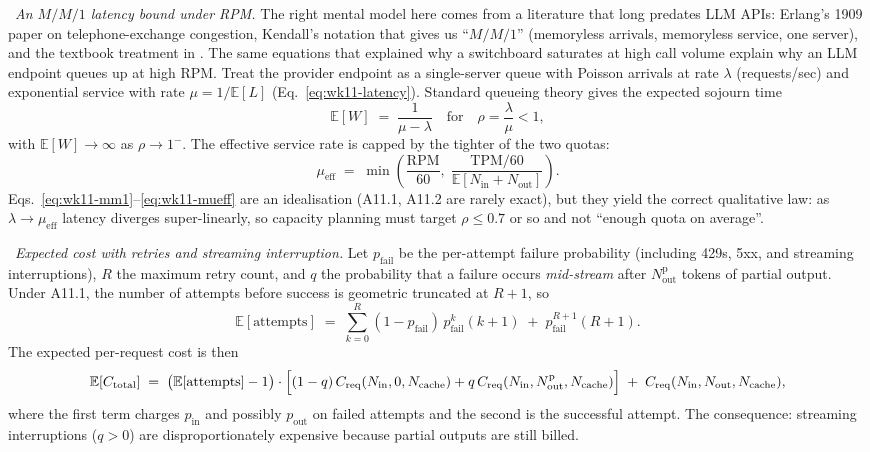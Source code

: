 \Ident\ \emph{An $M/M/1$ latency bound under RPM.} The right
mental model here comes from a literature that long predates LLM
APIs: Erlang's 1909 paper on telephone-exchange congestion,
Kendall's notation that gives us ``$M/M/1$'' (memoryless arrivals,
memoryless service, one server), and the textbook treatment in
\citet{kleinrock1975queueing}. The same equations that explained
why a switchboard saturates at high call volume explain why an
LLM endpoint queues up at high RPM. Treat the provider endpoint
as a single-server queue with Poisson arrivals at rate $\lambda$
(requests/sec) and exponential service with rate
$\mu = 1/\mathbb{E}[L]$ (Eq.~\eqref{eq:wk11-latency}). Standard
queueing theory gives the expected sojourn time
\begin{equation}
  \mathbb{E}[W]
  \;=\; \frac{1}{\mu - \lambda}
  \quad\text{for}\quad
  \rho = \frac{\lambda}{\mu} < 1,
  \label{eq:wk11-mm1}
\end{equation}
with $\mathbb{E}[W] \to \infty$ as $\rho \to 1^-$. The effective
service rate is capped by the tighter of the two quotas:
\begin{equation}
  \mu_\mathrm{eff}
  \;=\; \min\!\left(
      \frac{\mathrm{RPM}}{60},\;
      \frac{\mathrm{TPM}/60}{\mathbb{E}[N_\mathrm{in} + N_\mathrm{out}]}
  \right).
  \label{eq:wk11-mueff}
\end{equation}
Eqs.~\eqref{eq:wk11-mm1}--\eqref{eq:wk11-mueff} are an idealisation
(A11.1, A11.2 are rarely exact), but they yield the correct
qualitative law: as $\lambda \to \mu_\mathrm{eff}$ latency diverges
super-linearly, so capacity planning must target $\rho \le 0.7$ or
so and not ``enough quota on average''.

\Ident\ \emph{Expected cost with retries and streaming
interruption.} Let $p_\mathrm{fail}$ be the per-attempt failure
probability (including 429s, 5xx, and streaming interruptions),
$R$ the maximum retry count, and $q$ the probability that a
failure occurs \emph{mid-stream} after $N_\mathrm{out}^\mathrm{p}$
tokens of partial output. Under A11.1, the number of attempts
before success is geometric truncated at $R+1$, so
\begin{equation}
  \mathbb{E}[\text{attempts}]
  \;=\; \sum_{k=0}^{R} (1 - p_\mathrm{fail})\,p_\mathrm{fail}^{k}(k+1)
      \;+\; p_\mathrm{fail}^{R+1}(R+1).
  \label{eq:wk11-retry-count}
\end{equation}
The expected per-request cost is then
\begin{equation}
  \mathbb{E}[C_\mathrm{total}]
  \;=\; \bigl(\mathbb{E}[\text{attempts}] - 1\bigr)
        \cdot \Bigl[(1-q)\,C_\mathrm{req}(N_\mathrm{in}, 0, N_\mathrm{cache})
                 + q\,C_\mathrm{req}(N_\mathrm{in}, N_\mathrm{out}^\mathrm{p}, N_\mathrm{cache})\Bigr]
      \;+\; C_\mathrm{req}(N_\mathrm{in}, N_\mathrm{out}, N_\mathrm{cache}),
  \label{eq:wk11-cost-retry}
\end{equation}
where the first term charges $p_\mathrm{in}$ and possibly
$p_\mathrm{out}$ on failed attempts and the second is the
successful attempt. The consequence: streaming interruptions
($q > 0$) are disproportionately expensive because partial outputs
are still billed.

